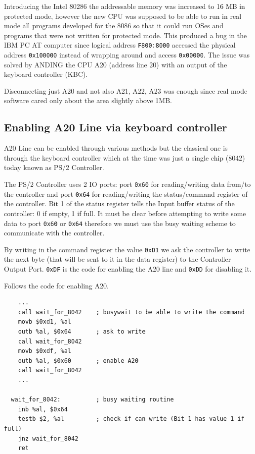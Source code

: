 \documentclass[twoside]{article}
\begin{document}
Introducing  the Intel 80286 the addressable memory was increased to 16 MB in protected mode, however the new CPU was supposed to be able to run in real mode all programs developed for the 8086 so that it could run OSes and programs that were not written for protected mode. This produced a bug in the IBM PC AT computer since logical address \texttt{F800:8000} accessed the physical address \texttt{0x100000} instead of wrapping around and access \texttt{0x00000}. The issue was solved by ANDING the CPU A20 (address line 20) with an output of the keyboard controller (KBC).

Disconnecting just A20 and not also A21, A22, A23 was enough since real mode software cared only about the area slightly above 1MB.

\subsection{Enabling A20 Line via keyboard controller}
A20 Line can be enabled through various methods but the classical one is through the keyboard controller which at the time was just a single chip (8042) today known as PS/2 Controller.

The PS/2 Controller uses 2 IO ports: port \texttt{0x60} for reading/writing data from/to the controller and port \texttt{0x64} for reading/writing the status/command register of the controller. Bit 1 of the status register tells the Input buffer status of the controller: 0 if empty, 1 if full. It must be clear before attempting to write some data to port \texttt{0x60} or \texttt{0x64} therefore we must use the busy waiting scheme to communicate with the controller.

By writing in the command register the value \texttt{0xD1} we ask the controller to write the next byte (that will be sent to it in the data register) to the Controller Output Port. \texttt{0xDF} is the code for enabling the A20 line and \texttt{0xDD} for disabling it. 

Follows the code for enabling A20.

\begin{verbatim}
    ...
    call wait_for_8042    ; busywait to be able to write the command
    movb $0xd1, %al
    outb %al, $0x64       ; ask to write
    call wait_for_8042
    movb $0xdf, %al
    outb %al, $0x60       ; enable A20
    call wait_for_8042
    ...
  
  wait_for_8042:          ; busy waiting routine
    inb %al, $0x64
    testb $2, %al         ; check if can write (Bit 1 has value 1 if full)
    jnz wait_for_8042
    ret
\end{verbatim}
\end{document}

